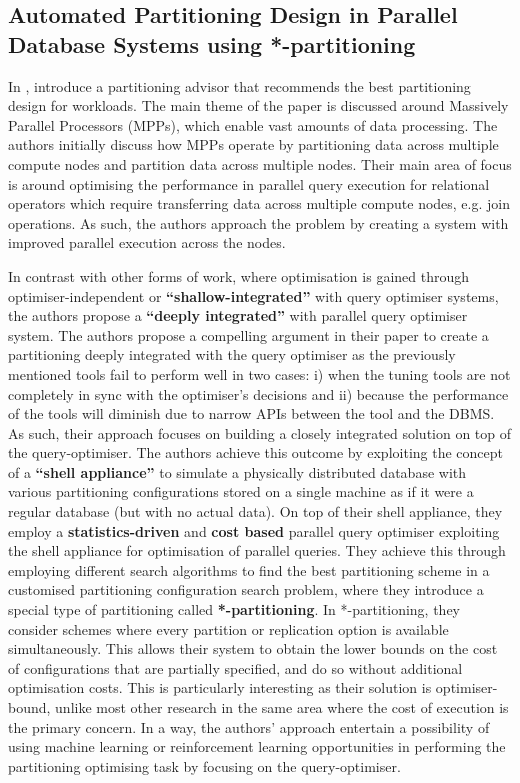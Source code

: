 \subsection{Automated Partitioning Design in Parallel Database Systems using *-partitioning}

In \cite{DBLP:conf/sigmod/NehmeB11}, \citeauthor{DBLP:conf/sigmod/NehmeB11} introduce a partitioning advisor that recommends the best partitioning design for workloads. The main theme of the paper is discussed around Massively Parallel Processors (MPPs), which enable vast amounts of data processing. The authors initially discuss how MPPs operate by partitioning data across multiple compute nodes and partition data across multiple nodes. Their main area of focus is around optimising the performance in parallel query execution for relational operators which require transferring data across multiple compute nodes, e.g. join operations. As such, the authors approach the problem by creating a system with improved parallel execution across the nodes.

In contrast with other forms of work, where optimisation is gained through optimiser-independent  or \textbf{“shallow-integrated”} with query optimiser systems, the authors propose a \textbf{“deeply integrated”} with parallel query optimiser system. The authors propose a compelling argument in their paper to create a partitioning deeply integrated with the query optimiser as the previously mentioned tools fail to perform well in two cases: i) when the tuning tools are not completely in sync with the optimiser’s decisions and ii) because the performance of the tools will diminish due to narrow APIs between the tool and the DBMS. As such, their approach focuses on building a closely integrated solution on top of the query-optimiser. The authors achieve this outcome by exploiting the concept of a \textbf{“shell appliance”} to simulate a physically distributed database with various partitioning configurations stored on a single machine as if it were a regular database (but with no actual data). On top of their shell appliance, they employ a \textbf{statistics-driven} and \textbf{cost based} parallel query optimiser exploiting the shell appliance for optimisation of parallel queries. They achieve this through employing different search algorithms to find the best partitioning scheme in a customised partitioning configuration search problem, where they introduce a special type of partitioning called \textbf{*-partitioning}. In *-partitioning, they consider schemes where every partition or replication option is available simultaneously. This allows their system to obtain the lower bounds on the cost of configurations that are partially specified, and do so without additional optimisation costs. This is particularly interesting as their solution is optimiser-bound, unlike most other research in the same area where the cost of execution is the primary concern. In a way, the authors’ approach entertain a possibility of using machine learning or reinforcement learning opportunities in performing the partitioning optimising task by focusing on the query-optimiser.

